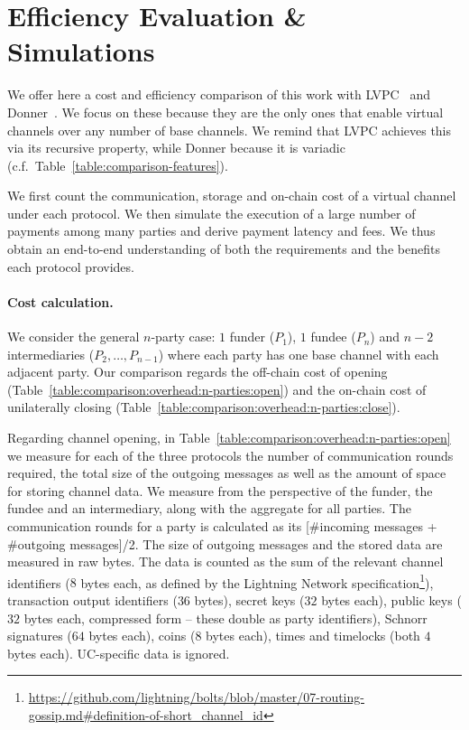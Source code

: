 \section{Efficiency Evaluation \& Simulations}
  \label{section:comparison}
  We offer here a cost and efficiency comparison of this work with
  LVPC~\cite{10.1007/978-3-030-65411-5_18} and Donner~\cite{donner}. We focus on
  these because they are the only ones that enable
  virtual channels over any number of base channels. We remind that LVPC
  achieves this via its recursive property, while Donner
  because it is variadic (c.f.\ Table~\ref{table:comparison-features}).

  We first count the communication, storage and on-chain cost of a virtual
  channel under each protocol. We then simulate the execution of a large number
  of payments among many parties and derive payment latency and fees. We thus
  obtain an end-to-end understanding of both the requirements and the benefits
  each protocol provides.

  \paragraph{Cost calculation.} We consider the general $n$-party case: $1$
  funder ($P_1$), $1$ fundee ($P_n$) and $n-2$ intermediaries ($P_2, \dots,
  P_{n-1}$) where each party has one base channel with each adjacent party. Our
  comparison regards the off-chain cost of opening
  (Table~\ref{table:comparison:overhead:n-parties:open}) and the on-chain cost
  of unilaterally closing
  (Table~\ref{table:comparison:overhead:n-parties:close}).

  Regarding channel opening, in
  Table~\ref{table:comparison:overhead:n-parties:open} we measure for each of
  the three protocols the number of communication rounds required, the total
  size of the outgoing messages as well as the amount of space for storing
  channel data. We measure from the perspective of the funder, the fundee
  and an intermediary, along with the aggregate for all parties. The
  communication rounds for a party is calculated as its [\#incoming messages +
  \#outgoing messages]/2. The size of outgoing messages and the stored data are
  measured in raw bytes. The data is counted as the sum of the relevant channel
  identifiers ($8$ bytes each, as defined by the Lightning Network
  specification\footnote{\url{https://github.com/lightning/bolts/blob/master/07-routing-gossip.md\#definition-of-short_channel_id}}),
  transaction output identifiers ($36$ bytes), secret keys ($32$ bytes each),
  public keys ($32$ bytes each, compressed form -- these double as party
  identifiers), Schnorr signatures ($64$ bytes each), coins ($8$ bytes each),
  times and timelocks (both $4$ bytes each). UC-specific data is ignored.

